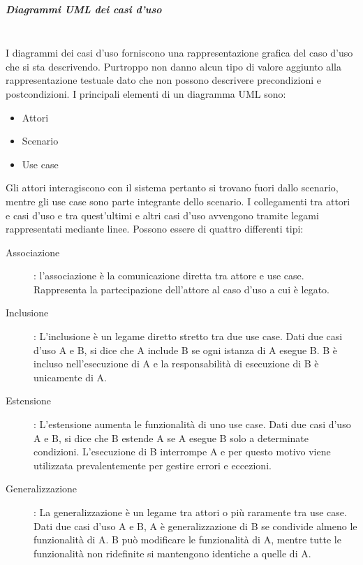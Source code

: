 \documentclass[../norme-di-progetto.tex]{subfiles}
\begin{document}
\subparagraph{Diagrammi UML dei casi d'uso}%
\label{subp:diagrammi UML dei casi d'uso}
\\I diagrammi dei casi d'uso forniscono una rappresentazione grafica del caso d'uso che si sta descrivendo. Purtroppo non danno alcun tipo di valore aggiunto alla rappresentazione testuale dato che non possono descrivere precondizioni e postcondizioni. I principali elementi di un diagramma UML sono:
\begin{itemize}
  \item Attori
  \item Scenario
  \item Use case
\end{itemize}
Gli attori interagiscono con il sistema pertanto si trovano fuori dallo scenario, mentre gli use case sono parte integrante dello scenario. I collegamenti tra attori e casi d'uso e tra quest'ultimi e altri casi d'uso avvengono tramite legami rappresentati mediante linee. Possono essere di quattro differenti tipi:
\begin{description}
  \item [Associazione]: l'associazione è la comunicazione diretta tra attore e use case. Rappresenta la partecipazione dell'attore al caso d'uso a cui è legato.
  \item [Inclusione]: L'inclusione è un legame diretto stretto tra due use case. Dati due casi d'uso A e B, si dice che A include B se ogni istanza di A esegue B. B è incluso nell'esecuzione di A e la responsabilità di esecuzione di B è unicamente di A.
  \item [Estensione]: L'estensione aumenta le funzionalità di uno use case. Dati due casi d'uso A e B, si dice che B estende A se A esegue B solo a determinate condizioni. L'esecuzione di B interrompe A e per questo motivo viene utilizzata prevalentemente per gestire errori e eccezioni.
  \item [Generalizzazione]: La generalizzazione è un legame tra attori o più raramente tra use case. Dati due casi d'uso A e B, A è generalizzazione di B se condivide almeno le funzionalità di A. B può modificare le funzionalità di A, mentre tutte le funzionalità non ridefinite si mantengono identiche a quelle di A.
\end{description}
\end{document}
